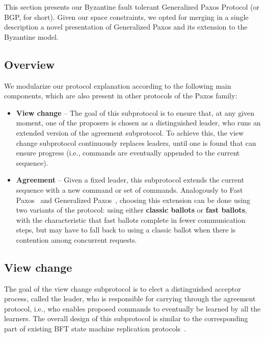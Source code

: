 This section presents our Byzantine fault tolerant Generalized Paxos
Protocol (or BGP, for short). Given our space constraints, we opted
for merging in a single description a novel presentation of
Generalized Paxos and its extension to the Byzantine model.
\subsection{Overview}

We modularize our protocol explanation according to the following main components, which are also present in other protocols of the Paxos family:

\begin{itemize}

\item
  {\bf View change} -- The goal of this subprotocol is to ensure that, at any given moment, one of the proposers is chosen as a distinguished leader, who runs an extended version of the agreement subprotocol. To achieve this, the view change subprotocol continuously replaces leaders, until one is found that can ensure progress (i.e., commands are eventually appended to the current sequence).

\item
{\bf Agreement} -- Given a fixed leader, this subprotocol extends the current sequence with a new command or set of commands. Analogously to Fast Paxos~\cite{L06} and Generalized Paxos~\cite{Lamport2005}, choosing this extension can be done using two variants of the protocol: using either {\bf classic ballots} or {\bf fast ballots}, with the characteristic that fast ballots complete in fewer communication steps, but may have to fall back to using a classic ballot when there is contention among concurrent requests.

\end{itemize}

\subsection{View change} 

The goal of the view change subprotocol is to elect a distinguished acceptor process, called the leader, who is responsible for carrying through the agreement protocol, i.e., who enables proposed commands to eventually be learned by all the learners. The overall design of this subprotocol is similar to the corresponding part of existing BFT state machine replication protocols~\cite{CL99}.

